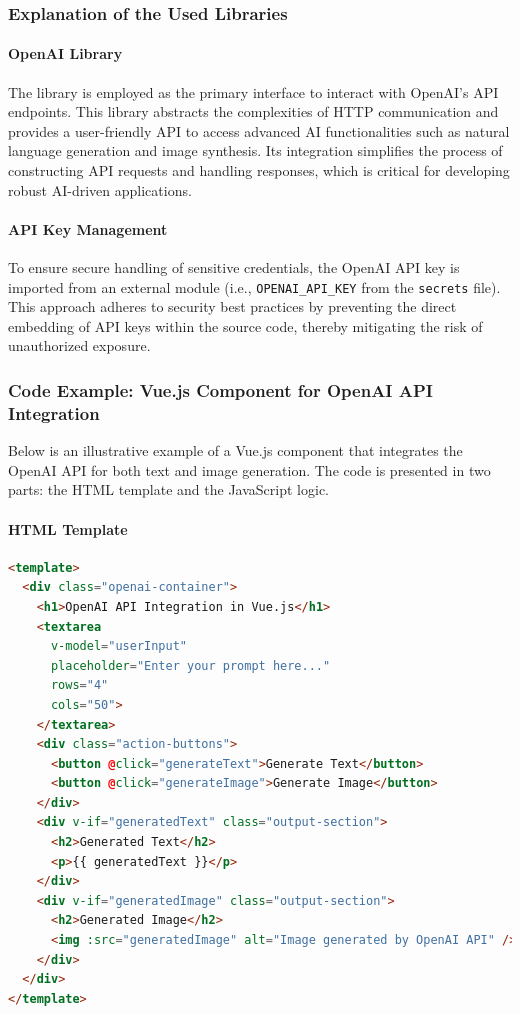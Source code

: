 \subsubsection{Explanation of the Used Libraries}

\paragraph{OpenAI Library}  
The library is employed as the primary interface to interact with OpenAI’s API endpoints. This library abstracts the complexities of HTTP communication and provides a user-friendly API to access advanced AI functionalities such as natural language generation and image synthesis. Its integration simplifies the process of constructing API requests and handling responses, which is critical for developing robust AI-driven applications.

\paragraph{API Key Management}  
To ensure secure handling of sensitive credentials, the OpenAI API key is imported from an external module (i.e., \texttt{OPENAI\_API\_KEY} from the \texttt{secrets} file). This approach adheres to security best practices by preventing the direct embedding of API keys within the source code, thereby mitigating the risk of unauthorized exposure.

\subsubsection{Code Example: Vue.js Component for OpenAI API Integration}

Below is an illustrative example of a Vue.js component that integrates the OpenAI API for both text and image generation. The code is presented in two parts: the HTML template and the JavaScript logic.

\paragraph{HTML Template}
\begin{lstlisting}[language=HTML, caption=Vue.js Template for OpenAI API Integration]
<template>
  <div class="openai-container">
    <h1>OpenAI API Integration in Vue.js</h1>
    <textarea 
      v-model="userInput" 
      placeholder="Enter your prompt here..." 
      rows="4" 
      cols="50">
    </textarea>
    <div class="action-buttons">
      <button @click="generateText">Generate Text</button>
      <button @click="generateImage">Generate Image</button>
    </div>
    <div v-if="generatedText" class="output-section">
      <h2>Generated Text</h2>
      <p>{{ generatedText }}</p>
    </div>
    <div v-if="generatedImage" class="output-section">
      <h2>Generated Image</h2>
      <img :src="generatedImage" alt="Image generated by OpenAI API" />
    </div>
  </div>
</template>
\end{lstlisting}

